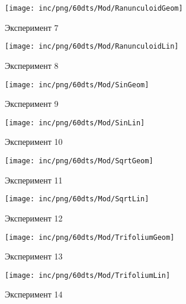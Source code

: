 \begin{figure}  
	\begin{minipage}{0,5\textwidth}
		\texttt{[image: inc/png/60dts/Mod/RanunculoidGeom]}
		\label{fig:app1}
		\caption{Эксперимент 7}
	\end{minipage}
	\begin{minipage}{0,5\textwidth}
		\texttt{[image: inc/png/60dts/Mod/RanunculoidLin]}
		\label{fig:app2}
		\caption{Эксперимент 8}
	\end{minipage}
	
	\begin{minipage}{0,5\textwidth}
		\texttt{[image: inc/png/60dts/Mod/SinGeom]}
		\label{fig:app1}
		\caption{Эксперимент 9}
	\end{minipage}
	\begin{minipage}{0,5\textwidth}
		\texttt{[image: inc/png/60dts/Mod/SinLin]}
		\label{fig:app2}
		\caption{Эксперимент 10}
	\end{minipage}
	
	\begin{minipage}{0,5\textwidth}
		\texttt{[image: inc/png/60dts/Mod/SqrtGeom]}
		\label{fig:app1}
		\caption{Эксперимент 11}
	\end{minipage}
	\begin{minipage}{0,5\textwidth}
		\texttt{[image: inc/png/60dts/Mod/SqrtLin]}
		\label{fig:app2}
		\caption{Эксперимент 12}
	\end{minipage}
	
	\begin{minipage}{0,5\textwidth}
		\texttt{[image: inc/png/60dts/Mod/TrifoliumGeom]}
		\label{fig:app1}
		\caption{Эксперимент 13}
	\end{minipage}
	\begin{minipage}{0,5\textwidth}
		\texttt{[image: inc/png/60dts/Mod/TrifoliumLin]}
		\label{fig:app2}
		\caption{Эксперимент 14}
	\end{minipage}
\end{figure}
\clearpage


